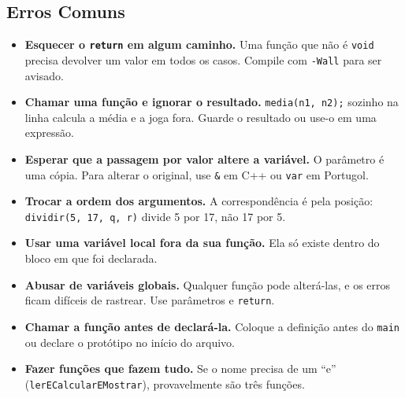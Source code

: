 \subsection{Erros Comuns}

\begin{itemize}
  \item \textbf{Esquecer o \texttt{return} em algum caminho.} Uma função que não é \texttt{void} precisa devolver um valor em todos os casos. Compile com \texttt{-Wall} para ser avisado.
  \item \textbf{Chamar uma função e ignorar o resultado.} \texttt{media(n1, n2);} sozinho na linha calcula a média e a joga fora. Guarde o resultado ou use-o em uma expressão.
  \item \textbf{Esperar que a passagem por valor altere a variável.} O parâmetro é uma cópia. Para alterar o original, use \texttt{\&} em C++ ou \texttt{var} em Portugol.
  \item \textbf{Trocar a ordem dos argumentos.} A correspondência é pela posição: \texttt{dividir(5, 17, q, r)} divide 5 por 17, não 17 por 5.
  \item \textbf{Usar uma variável local fora da sua função.} Ela só existe dentro do bloco em que foi declarada.
  \item \textbf{Abusar de variáveis globais.} Qualquer função pode alterá-las, e os erros ficam difíceis de rastrear. Use parâmetros e \texttt{return}.
  \item \textbf{Chamar a função antes de declará-la.} Coloque a definição antes do \texttt{main} ou declare o protótipo no início do arquivo.
  \item \textbf{Fazer funções que fazem tudo.} Se o nome precisa de um ``e'' (\texttt{lerECalcularEMostrar}), provavelmente são três funções.
\end{itemize}
